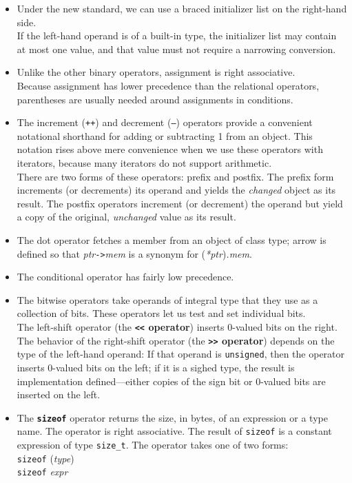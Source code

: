 \begin{itemize}
\item
Under the new standard, we can use a braced initializer list on the right-hand side.\\
If the left-hand operand is of a built-in type, the initializer list may contain at most one value, and that value must not require a narrowing conversion.

\item
Unlike the other binary operators, assignment is right associative.\\
Because assignment has lower precedence than the relational operators, parentheses are usually needed around assignments in conditions.

\item
The increment (\texttt{++}) and decrement (\texttt{--}) operators provide a convenient notational shorthand for adding or subtracting 1 from an object. This notation rises above mere convenience when we use these operators with iterators, because many iterators do not support arithmetic.\\
There are two forms of these operators: prefix and postfix.  The prefix form increments (or decrements) its operand and yields the \textit{changed} object as its result. The postfix operators increment (or decrement) the operand but yield a copy of the original, \textit{unchanged} value as its result.

\item
The dot operator fetches a member from an object of class type; arrow is defined so that \textit{ptr}\texttt{->}\textit{mem} is a synonym for (\textit{*ptr})\textit{.mem}.

\item
The conditional operator has fairly low precedence.

\item
The bitwise operators take operands of integral type that they use as a collection of bits. These operators let us test and set individual bits.\\
The left-shift operator (the \textbf{\texttt{<<} operator}) inserts 0-valued bits on the right. The behavior of the right-shift operator (the \textbf{\texttt{>>} operator}) depends on the type of the left-hand operand: If that operand is \texttt{unsigned}, then the operator inserts 0-valued bits on the left; if it is a sighed type, the result is implementation defined---either copies of the sign bit or 0-valued bits are inserted on the left.

\item
The \texttt{\textbf{sizeof}} operator returns the size, in bytes, of an expression or a type name. The operator is right associative. The result of \texttt{sizeof} is a constant expression of type \texttt{size\_t}. The operator takes one of two forms:\\
\hspace*{1em}\texttt{sizeof} (\textit{type})\\
\hspace*{1em}\texttt{sizeof} \textit{expr}


\end{itemize}
